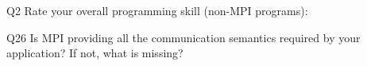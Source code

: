 \begin{description}%
\item{Q2} Rate your overall programming skill (non-MPI programs):%
\item{Q26} Is MPI providing all the communication semantics required by your application? If not, what is missing?%
\end{description}%

